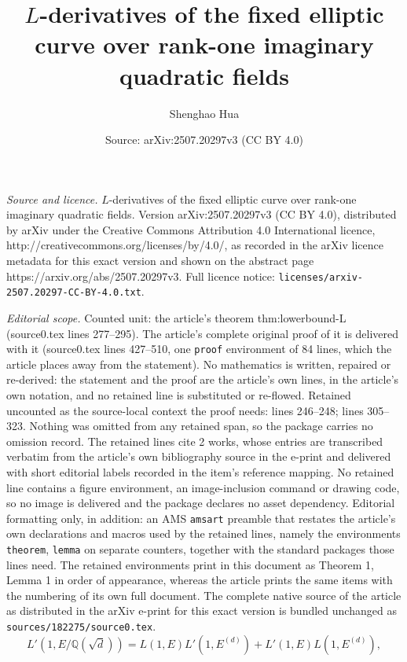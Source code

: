 \documentclass[10pt,a4paper]{amsart}
\title{$L$-derivatives of the fixed elliptic curve over rank-one imaginary quadratic fields}
\author{Shenghao Hua}
\date{Source: arXiv:2507.20297v3 (CC BY 4.0)}
\begin{document}
\maketitle

\noindent\emph{Source and licence.} $L$-derivatives of the fixed elliptic curve over rank-one imaginary quadratic fields. Version arXiv:2507.20297v3 (CC BY 4.0), distributed by arXiv under the Creative Commons Attribution 4.0 International licence, http://creativecommons.org/licenses/by/4.0/, as recorded in the arXiv licence metadata for this exact version and shown on the abstract page https://arxiv.org/abs/2507.20297v3. Full licence notice: \texttt{licenses/arxiv-2507.20297-CC-BY-4.0.txt}.\par\smallskip

\noindent\textit{Editorial scope.} Counted unit: the article's theorem thm:lowerbound-L (source0.tex lines 277--295). The article's complete original proof of it is delivered with it (source0.tex lines 427--510, one \texttt{proof} environment of 84 lines, which the article places away from the statement). No mathematics is written, repaired or re-derived: the statement and the proof are the article's own lines, in the article's own notation, and no retained line is substituted or re-flowed.  Retained uncounted as the source-local context the proof needs: lines 246--248; lines 305--323.  Nothing was omitted from any retained span, so the package carries no omission record.  The retained lines cite 2 works, whose entries are transcribed verbatim from the article's own bibliography source in the e-print and delivered with short editorial labels recorded in the item's reference mapping.  No retained line contains a figure environment, an image-inclusion command or drawing code, so no image is delivered and the package declares no asset dependency.  Editorial formatting only, in addition: an AMS \texttt{amsart} preamble that restates the article's own declarations and macros used by the retained lines, namely the environments \texttt{theorem}, \texttt{lemma} on separate counters, together with the standard packages those lines need.  The retained environments print in this document as Theorem 1, Lemma 1 in order of appearance, whereas the article prints the same items with the numbering of its own full document.  The complete native source of the article as distributed in the arXiv e-print for this exact version is bundled unchanged as \texttt{sources/182275/source0.tex}.
\begin{equation}\label{eqn:L'EK}
  L'(1, E/\mathbb{Q}(\sqrt{d})) = L(1, E) L'(1, E^{(d)}) + L'(1, E) L(1, E^{(d)}),
\end{equation}
\end{document}
